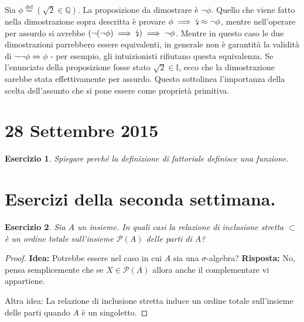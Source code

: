 \documentclass[fontsize = 11 pt, paper=A4, oneside, index=totoc, hyperref]{article}
\theoremstyle{definition}
\theoremstyle{plain}
\newtheorem{exe}{Esercizio}[section]
\newcommand{\assurdo}{\text{\lightning}}
\begin{document}
Sia \(\phi \overset{\text{def}}{=} \left(\sqrt{2} \in \mathbb{Q}\right)\). La proposizione da dimostrare è \(\lnot \phi\). Quello che viene fatto nella dimostrazione sopra descritta è provare \(\phi \implies \assurdo \approx \lnot \phi\), mentre nell'operare per assurdo si avrebbe \(\left(\lnot(\lnot \phi) \implies \assurdo\right) \implies \lnot \phi\). Mentre in questo caso le due dimostrazioni parrebbero essere equivalenti, in generale non è garantità la validità di \(\lnot\lnot\phi \iff \phi\)
- per esempio, gli intuizionisti rifiutano questa equivalenza. Se l'enunciato della proposizione fosse stato \(\sqrt{2} \in \mathbb{I}\), ecco che la dimostrazione sarebbe stata effettivamente per assurdo. Questo sottolinea l'importanza della scelta dell'assunto che si pone essere come proprietà primitiva.

\section{28 Settembre 2015}

\begin{exe}
  Spiegare perché la definizione di fattoriale definisce una funzione.
\end{exe}

\section{Esercizi della seconda settimana.}

\begin{exe}
  Sia \(A\) un insieme. In quali casi la relazione di inclusione stretta \(\subset\) è un ordine totale sull'insieme \(\mathcal{P}(A)\) delle parti di \(A\)?
\end{exe}
\begin{proof}
  {\bf Idea:} Potrebbe essere nel caso in cui \(A\) sia una \(\sigma\)-algebra?
  {\bf Risposta:} No, pensa semplicemente che se \(X \in \mathcal{P}(A)\) allora anche il complementare vi appartiene.

  Altra idea: La relazione di inclusione stretta induce un ordine totale sull'insieme delle parti quando \(A\) è un singoletto.
\end{proof}
\end{document}
